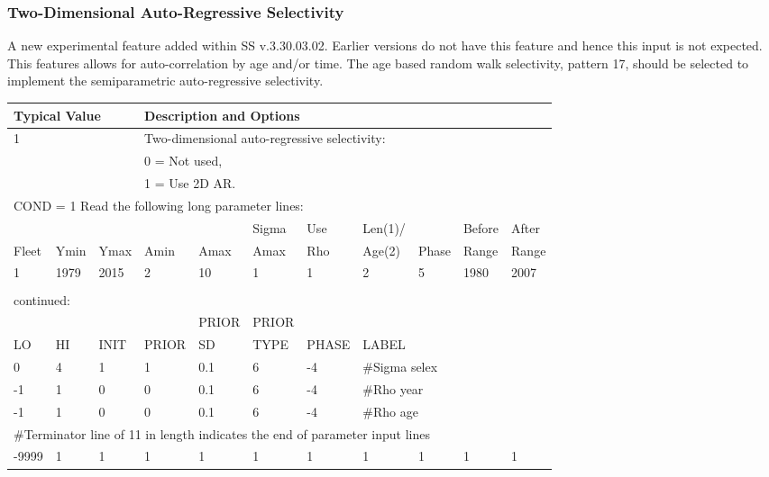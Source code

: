 \subsubsection{Two-Dimensional Auto-Regressive Selectivity}
A new experimental feature added within SS v.3.30.03.02. Earlier versions do not have this feature and hence this input is not expected. This features allows for auto-correlation by age and/or time.  The age based random walk selectivity, pattern 17, should be selected to implement the semiparametric auto-regressive selectivity. 


\begin{longtable}{p{1cm} p{1cm} p{1cm} p{1.25cm} p{1.25cm} p{1.25cm} p{1.2cm} p{1.2cm} p{1cm} p{1cm} p{1cm}}
		
	\multicolumn{3}{l}{Typical Value} &  \multicolumn{8}{l}{Description and Options} \\
	\hline

	\multicolumn{3}{l}{1} & \multicolumn{8}{l}{Two-dimensional auto-regressive selectivity:}\Tstrut\\
	\multicolumn{3}{l}{ } & \multicolumn{8}{l}{0 = Not used,}\\
	\multicolumn{3}{l}{ } & \multicolumn{8}{l}{1 = Use 2D AR.}\Tstrut\\

	\multicolumn{11}{l}{COND = 1 Read the following long parameter lines:}\\
	\hline
	\Tstrut &    &      &      &      & Sigma & Use & Len(1)/ &       & Before & After\\
	Fleet & Ymin & Ymax & Amin & Amax & Amax  & Rho & Age(2)  & Phase & Range  & Range\Bstrut\\
	\hline
	   1    & 1979 & 2015 &  2   &  10  & 1     & 1   & 2       & 5     & 1980   & 2007\Tstrut\Bstrut\\
	\hline
	\\
	
	\multicolumn{11}{l}{continued:} \\
	\hline
	     &    &      &       & PRIOR & PRIOR &       &     & & & \Tstrut\\
	LO & HI & INIT & PRIOR & SD    & TYPE  & PHASE & \multicolumn{4}{l}{LABEL}\Bstrut\\
	\hline
	 0 & 4 & 1 & 1 & 0.1 & 6 & -4 & \multicolumn{4}{l}{\#Sigma selex}\Tstrut\\
	-1 & 1 & 0 & 0 & 0.1 & 6 & -4 & \multicolumn{4}{l}{\#Rho year}\\
	-1 & 1 & 0 & 0 & 0.1 & 6 & -4 & \multicolumn{4}{l}{\#Rho age}\Bstrut\\
	\multicolumn{11}{l}{\#Terminator line of 11 in length indicates the end of parameter input lines}\\
	-9999 & 1 & 1 & 1 & 1 & 1 & 1 & 1 & 1 & 1 & 1 \\
	\hline
\end{longtable}


